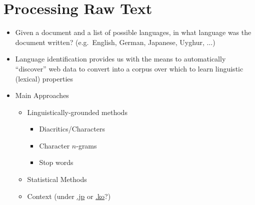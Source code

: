 \documentclass[a4paper,landscape,headrule,footrule,xetex]{foils}
\begin{document}


\section{Processing Raw Text}


\begin{itemize}

\item Given a document and a list of possible languages, in
  what language was the document written? (e.g.\ English, German, Japanese, Uyghur, ...)
\item Language identification provides us with the means to
  automatically ``discover'' web data to convert into a corpus over
  which to learn linguistic (lexical) properties
\item Main Approaches
\begin{itemize}
\item Linguistically-grounded methods
  \begin{itemize}
  \item Diacritics/Characters
  \item Character $n$-grams
  \item Stop words
  \end{itemize}
\item Statistical Methods
\item Context (under \url{.jp} or \url{.ko}?)
\end{itemize}


\end{itemize}

\end{document}
